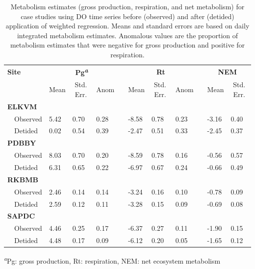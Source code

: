 \documentclass[letterpaper,12pt,oneside]{article}\usepackage[]{graphicx}\usepackage[]{color}
\begin{document}
%
\begin{table}[!tbp]
\caption{Metabolism estimates (gross production, respiration, and net metabolism) for case studies using \ac{DO} time series before (observed) and after (detided) application of weighted regression.  Means and standard errors are based on daily integrated metabolism estimates.  Anomalous values are the proportion of metabolism estimates that were negative for gross production and positive for respiration.\label{tab:case_res}} 
\begin{center}
\begin{tabular}{llllclllcll}
\hline\hline
\multicolumn{1}{l}{\bfseries Site}&\multicolumn{3}{c}{\bfseries Pg\textsuperscript{\textit{a}}}&\multicolumn{1}{c}{\bfseries }&\multicolumn{3}{c}{\bfseries Rt}&\multicolumn{1}{c}{\bfseries }&\multicolumn{2}{c}{\bfseries NEM}\tabularnewline
\cline{2-4} \cline{6-8} \cline{10-11}
\multicolumn{1}{l}{}&\multicolumn{1}{c}{Mean}&\multicolumn{1}{c}{Std. Err.}&\multicolumn{1}{c}{Anom}&\multicolumn{1}{c}{}&\multicolumn{1}{c}{Mean}&\multicolumn{1}{c}{Std. Err.}&\multicolumn{1}{c}{Anom}&\multicolumn{1}{c}{}&\multicolumn{1}{c}{Mean}&\multicolumn{1}{c}{Std. Err.}\tabularnewline
\hline
{\bfseries ELKVM}&&&&&&&&&&\tabularnewline
~~Observed&5.42&0.70&0.28&&-8.58&0.78&0.23&&-3.16&0.40\tabularnewline
~~Detided&0.02&0.54&0.39&&-2.47&0.51&0.33&&-2.45&0.37\tabularnewline
\hline
{\bfseries PDBBY}&&&&&&&&&&\tabularnewline
~~Observed&8.03&0.70&0.20&&-8.59&0.78&0.16&&-0.56&0.57\tabularnewline
~~Detided&6.31&0.65&0.22&&-6.97&0.67&0.24&&-0.66&0.49\tabularnewline
\hline
{\bfseries RKBMB}&&&&&&&&&&\tabularnewline
~~Observed&2.46&0.14&0.14&&-3.24&0.16&0.10&&-0.78&0.09\tabularnewline
~~Detided&2.59&0.12&0.11&&-3.28&0.15&0.09&&-0.69&0.08\tabularnewline
\hline
{\bfseries SAPDC}&&&&&&&&&&\tabularnewline
~~Observed&4.46&0.25&0.17&&-6.37&0.27&0.11&&-1.90&0.15\tabularnewline
~~Detided&4.48&0.17&0.09&&-6.12&0.20&0.05&&-1.65&0.12\tabularnewline
\hline
\end{tabular}
\end{center}
\textsuperscript{\textit{a}}Pg: gross production, Rt: respiration, NEM: net ecosystem metabolism\end{table}
\end{document}
